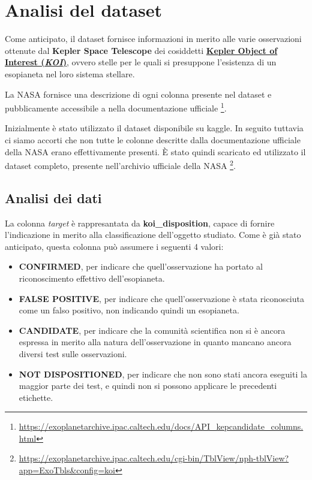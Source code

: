 \chapter{Analisi del dataset}
Come anticipato, il dataset fornisce informazioni in merito alle varie 
osservazioni ottenute dal \textbf{Kepler Space Telescope} dei cosiddetti
\href{https://en.wikipedia.org/wiki/Kepler_object_of_interest}
{\textbf{Kepler Object of Interest (\textit{KOI})}}, ovvero stelle per le quali
si presuppone l'esistenza di un esopianeta nel loro sistema stellare.

La NASA fornisce una descrizione di ogni colonna presente nel dataset e 
pubblicamente accessibile a nella documentazione ufficiale
\footnote{\href{https://exoplanetarchive.ipac.caltech.edu/docs/API_kepcandidate_columns.html}
{https://exoplanetarchive.ipac.caltech.edu/docs/API\_kepcandidate\_columns.html}}.

Inizialmente è stato utilizzato il dataset disponibile su kaggle. In seguito tuttavia ci 
siamo accorti che non tutte le colonne descritte dalla documentazione ufficiale della NASA erano effettivamente 
presenti. 
È stato quindi scaricato ed utilizzato il dataset completo, presente nell'archivio ufficiale della NASA
\footnote{\href{https://exoplanetarchive.ipac.caltech.edu/cgi-bin/TblView/nph-tblView?app=ExoTbls&config=koi}
{https://exoplanetarchive.ipac.caltech.edu/cgi-bin/TblView/nph-tblView?app=ExoTbls\&config=koi}}.


\section{Analisi dei dati}

La colonna \textit{target} è rappresantata da \textbf{koi\_disposition}, 
capace di fornire l'indicazione in merito alla classificazione dell'oggetto studiato.
Come è già stato anticipato, questa colonna può assumere i seguenti 4 valori: 
\begin{itemize}
    \item \textbf{CONFIRMED}, per indicare che quell'osservazione ha portato al 
    riconoscimento effettivo dell'esopianeta.
    \item \textbf{FALSE POSITIVE}, per indicare che quell'osservazione è stata 
    riconosciuta come un falso positivo, non indicando quindi un esopianeta.
    \item \textbf{CANDIDATE}, per indicare che la comunità scientifica non si 
    è ancora espressa in merito alla natura dell'osservazione in quanto mancano
    ancora diversi test sulle osservazioni.
    \item \textbf{NOT DISPOSITIONED}, per indicare che non sono stati ancora 
    eseguiti la maggior parte dei test, e quindi non si possono applicare le 
    precedenti etichette.
\end{itemize}

